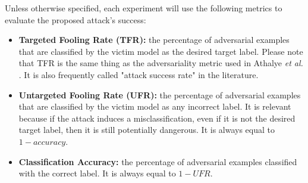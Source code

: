 Unless otherwise specified, each experiment will use the following metrics to evaluate the proposed attack's success:

\begin{itemize}
    \item \textbf{Targeted Fooling Rate (TFR):} the percentage of adversarial examples that are classified by the victim model as the desired target label. Please note that TFR is the same thing as the adversariality metric used in Athalye \textit{et al.} \cite{athalye}. It is also frequently called "attack success rate" in the literature.
    \item \textbf{Untargeted Fooling Rate (UFR):} the percentage of adversarial examples that are classified by the victim model as any incorrect label. It is relevant because if the attack induces a misclassification, even if it is not the desired target label, then it is still potentially dangerous.  It is always equal to $1 - accuracy$.
    \item \textbf{Classification Accuracy:} the percentage of adversarial examples classified with the correct label. It is always equal to $1 - UFR$.
\end{itemize}
